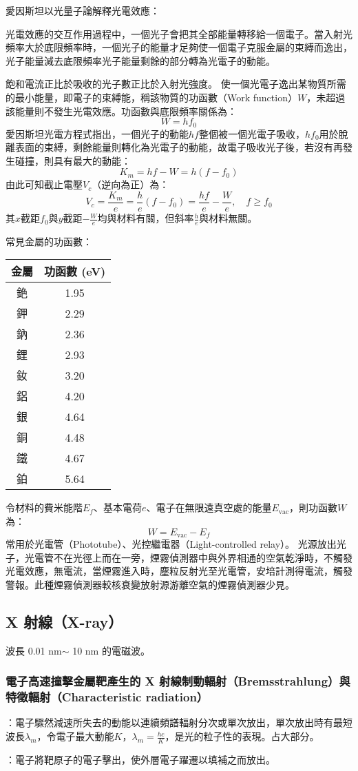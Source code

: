 \documentclass[a4paper,12pt]{article}
\begin{document}
\eit
{}
愛因斯坦以光量子論解釋光電效應：
\bit
\item 光電效應的交互作用過程中，一個光子會把其全部能量轉移給一個電子。當入射光頻率大於底限頻率時，一個光子的能量才足夠使一個電子克服金屬的束縛而逸出，光子能量減去底限頻率光子能量剩餘的部分轉為光電子的動能。
\item 飽和電流正比於吸收的光子數正比於入射光強度。
\eit
使一個光電子逸出某物質所需的最小能量，即電子的束縛能，稱該物質的功函數（Work function）$W$，未超過該能量則不發生光電效應。功函數與底限頻率關係為：
\[W= h f_0\]
愛因斯坦光電方程式指出，一個光子的動能$hf$整個被一個光電子吸收，$hf_0$用於脫離表面的束縛，剩餘能量則轉化為光電子的動能，故電子吸收光子後，若沒有再發生碰撞，則具有最大的動能：
\[K_m=hf-W=h(f-f_0)\]
由此可知截止電壓$V_c$（逆向為正）為：
\[V_c=\frac{K_m}{e}=\frac{h}{e}(f-f_0)=\frac{hf}{e}-\frac{W}{e},\quad f\geq f_0\]
其$x$截距$f_0$與$y$截距$-\frac{W}{e}$均與材料有關，但斜率$\frac{h}{e}$與材料無關。

常見金屬的功函數：
\begin{longtable}[c]{|c|c|}
\hline
金屬 & 功函數 (eV)\\\hline\endhead
銫 & 1.95\\\hline
鉀 & 2.29\\\hline
鈉 & 2.36\\\hline
鋰 & 2.93\\\hline
釹 & 3.20\\\hline
鋁 & 4.20\\\hline
銀 & 4.64\\\hline
銅 & 4.48\\\hline
鐵 & 4.67\\\hline
鉑 & 5.64\\\hline
\end{longtable}\FB
{}
令材料的費米能階$E_f$、基本電荷$e$、電子在無限遠真空處的能量$E_{\text{vac}}$，則功函數$W$為：
\[W=E_{\text{vac}}-E_f\]
常用於光電管（Phototube）、光控繼電器（Light-controlled relay）。
光源放出光子，光電管不在光徑上而在一旁，煙霧偵測器中與外界相通的空氣乾淨時，不觸發光電效應，無電流，當煙霧進入時，塵粒反射光至光電管，安培計測得電流，觸發警報。此種煙霧偵測器較核衰變放射源游離空氣的煙霧偵測器少見。
\subsection{X 射線（X-ray）}
波長 0.01 nm$\sim$ 10 nm 的電磁波。
\subsubsection{電子高速撞擊金屬靶產生的 X 射線制動輻射（Bremsstrahlung）與特徵輻射（Characteristic radiation）}
\bit
\item {}：電子驟然減速所失去的動能以連續頻譜輻射分次或單次放出，單次放出時有最短波長$\lambda_m$，令電子最大動能$K$，$\lambda_m=\frac{hc}{K}$，是光的粒子性的表現。占大部分。
\item {}：電子將靶原子的電子擊出，使外層電子躍遷以填補之而放出。
\eit
\end{document}
